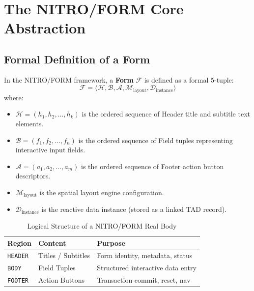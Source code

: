 \documentclass[10pt,journal,compsoc,twocolumn]{article}
\begin{document}
\section{The NITRO/FORM Core Abstraction}
\label{sec:core_abstraction}

\subsection{Formal Definition of a Form}
In the NITRO/FORM framework, a \textbf{Form} $\mathcal{F}$ is defined as a formal 5-tuple:
\begin{equation}
\mathcal{F} = \langle \mathcal{H}, \mathcal{B}, \mathcal{A}, \mathcal{M}_{\text{layout}}, \mathcal{D}_{\text{instance}} \rangle
\end{equation}
where:
\begin{itemize}[leftmargin=*]
    \item $\mathcal{H} = (h_1, h_2, \dots, h_k)$ is the ordered sequence of Header title and subtitle text elements.
    \item $\mathcal{B} = (f_1, f_2, \dots, f_n)$ is the ordered sequence of Field tuples representing interactive input fields.
    \item $\mathcal{A} = (a_1, a_2, \dots, a_m)$ is the ordered sequence of Footer action button descriptors.
    \item $\mathcal{M}_{\text{layout}}$ is the spatial layout engine configuration.
    \item $\mathcal{D}_{\text{instance}}$ is the reactive data instance (stored as a linked TAD record).
\end{itemize}

\begin{table}[htbp]
\caption{Logical Structure of a NITRO/FORM Real Body}
\label{tab:form_regions}
\centering
\footnotesize
\begin{tabular}{@{}lll@{}}
\toprule
\textbf{Region} & \textbf{Content} & \textbf{Purpose} \\
\midrule
\texttt{HEADER} & Titles / Subtitles & Form identity, metadata, status \\
\texttt{BODY}   & Field Tuples       & Structured interactive data entry \\
\texttt{FOOTER} & Action Buttons     & Transaction commit, reset, nav \\
\bottomrule
\end{tabular}
\end{table}
\end{document}
